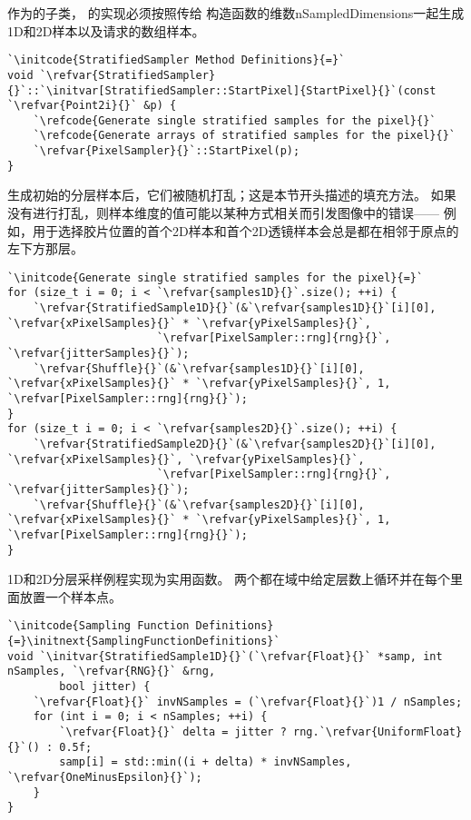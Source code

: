 作为的子类，
的实现必须按照传给
构造函数的维数{\ttfamily nSampledDimensions}一起生成1D和2D样本以及请求的数组样本。
\begin{lstlisting}
`\initcode{StratifiedSampler Method Definitions}{=}`
void `\refvar{StratifiedSampler}{}`::`\initvar[StratifiedSampler::StartPixel]{StartPixel}{}`(const `\refvar{Point2i}{}` &p) {
    `\refcode{Generate single stratified samples for the pixel}{}`
    `\refcode{Generate arrays of stratified samples for the pixel}{}`
    `\refvar{PixelSampler}{}`::StartPixel(p);
}
\end{lstlisting}

生成初始的分层样本后，它们被随机打乱；这是本节开头描述的填充方法。
如果没有进行打乱，则样本维度的值可能以某种方式相关而引发图像中的错误——
例如，用于选择胶片位置的首个2D样本和首个2D透镜样本会总是都在相邻于原点的左下方那层。
\begin{lstlisting}
`\initcode{Generate single stratified samples for the pixel}{=}`
for (size_t i = 0; i < `\refvar{samples1D}{}`.size(); ++i) {
    `\refvar{StratifiedSample1D}{}`(&`\refvar{samples1D}{}`[i][0], `\refvar{xPixelSamples}{}` * `\refvar{yPixelSamples}{}`,
                       `\refvar[PixelSampler::rng]{rng}{}`, `\refvar{jitterSamples}{}`);
    `\refvar{Shuffle}{}`(&`\refvar{samples1D}{}`[i][0], `\refvar{xPixelSamples}{}` * `\refvar{yPixelSamples}{}`, 1, `\refvar[PixelSampler::rng]{rng}{}`);
}
for (size_t i = 0; i < `\refvar{samples2D}{}`.size(); ++i) {
    `\refvar{StratifiedSample2D}{}`(&`\refvar{samples2D}{}`[i][0], `\refvar{xPixelSamples}{}`, `\refvar{yPixelSamples}{}`,
                       `\refvar[PixelSampler::rng]{rng}{}`, `\refvar{jitterSamples}{}`);
    `\refvar{Shuffle}{}`(&`\refvar{samples2D}{}`[i][0], `\refvar{xPixelSamples}{}` * `\refvar{yPixelSamples}{}`, 1, `\refvar[PixelSampler::rng]{rng}{}`);
}
\end{lstlisting}

1D和2D分层采样例程实现为实用函数。
两个都在域中给定层数上循环并在每个里面放置一个样本点。
\begin{lstlisting}
`\initcode{Sampling Function Definitions}{=}\initnext{SamplingFunctionDefinitions}`
void `\initvar{StratifiedSample1D}{}`(`\refvar{Float}{}` *samp, int nSamples, `\refvar{RNG}{}` &rng,
        bool jitter) {
    `\refvar{Float}{}` invNSamples = (`\refvar{Float}{}`)1 / nSamples;
    for (int i = 0; i < nSamples; ++i) {
        `\refvar{Float}{}` delta = jitter ? rng.`\refvar{UniformFloat}{}`() : 0.5f;
        samp[i] = std::min((i + delta) * invNSamples, `\refvar{OneMinusEpsilon}{}`);
    }
}
\end{lstlisting}

